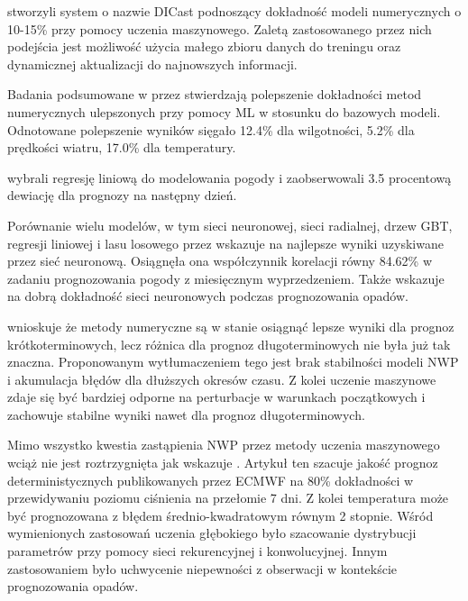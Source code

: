 \cite{machine-learning-for-applied-weather-prediction} stworzyli system 
o nazwie DICast podnoszący dokładność modeli numerycznych o 10-15\% przy pomocy
uczenia maszynowego. Zaletą zastosowanego przez nich podejścia jest możliwość
użycia małego zbioru danych do treningu oraz dynamicznej aktualizacji do 
najnowszych informacji.

Badania podsumowane w  przez  
\cite{ai-revolutionises-weather-prediction}
stwierdzają polepszenie dokładności metod numerycznych ulepszonych przy
pomocy ML w stosunku do bazowych modeli. Odnotowane polepszenie wyników
sięgało 12.4\% dla wilgotności, 5.2\% dla prędkości wiatru, 17.0\% dla
temperatury.

\cite{weather-monitoring-using-artificial-intelligence}
wybrali regresję liniową do modelowania pogody i zaobserwowali 3.5 procentową
dewiację dla prognozy na następny dzień.

Porównanie wielu modelów, w tym sieci neuronowej, sieci radialnej, 
drzew GBT, regresji liniowej i lasu losowego przez 
\cite{developing-machine-learning-algorithms} wskazuje na 
najlepsze wyniki uzyskiwane przez sieć neuronową. Osiągnęła ona 
współczynnik korelacji równy 84.62\% w zadaniu prognozowania
pogody z miesięcznym wyprzedzeniem. Także  
\cite{weather-forecasting-using-dl} wskazuje na dobrą dokładność
sieci neuronowych podczas prognozowania opadów.

\cite{ml-applied-to-weather-forecasting} wnioskuje że metody 
numeryczne są w stanie osiągnąć lepsze wyniki dla prognoz 
krótkoterminowych, lecz różnica dla prognoz długoterminowych
nie była już tak znaczna. Proponowanym wytłumaczeniem tego jest
brak stabilności modeli NWP i akumulacja błędów dla dłuższych 
okresów czasu. Z kolei uczenie maszynowe zdaje się być bardziej
odporne na perturbacje w warunkach początkowych i zachowuje 
stabilne wyniki nawet dla prognoz długoterminowych.

Mimo wszystko kwestia zastąpienia NWP przez metody uczenia maszynowego
wciąż nie jest roztrzygnięta jak wskazuje 
\cite{can-dl-beat-numerical}. Artykuł ten szacuje jakość prognoz 
deterministycznych publikowanych przez ECMWF na 80\% dokładności w przewidywaniu
poziomu ciśnienia na przełomie 7 dni. Z kolei temperatura może być 
prognozowana z błędem średnio-kwadratowym równym 2 stopnie. Wśród wymienionych
zastosowań uczenia głębokiego było szacowanie dystrybucji parametrów przy pomocy 
sieci rekurencyjnej i konwolucyjnej. Innym zastosowaniem było uchwycenie
niepewności z obserwacji w kontekście prognozowania opadów.

